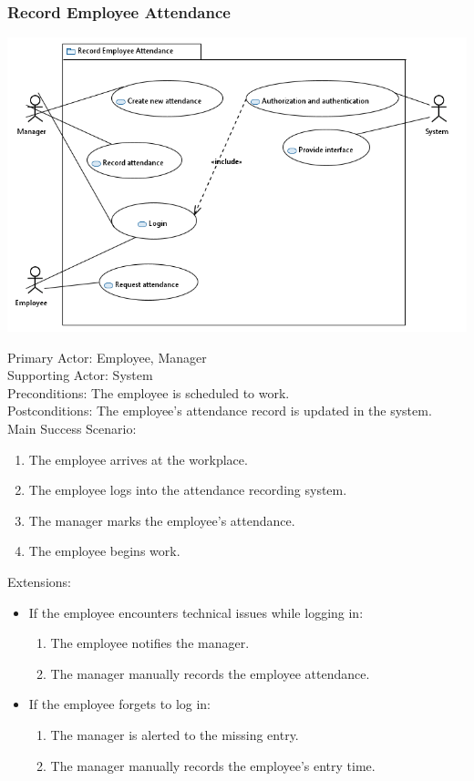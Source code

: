 \documentclass[a4paper, 12pt]{article}
\begin{document}
\subsubsection{Record Employee Attendance}
\begin{center}
\includegraphics[width=1\textwidth]{Record_Employee_Attendance_Use_Case.PNG}\par
\end{center}
Primary Actor: Employee, Manager\\
Supporting Actor: System\\
Preconditions: The employee is scheduled to work.\\
Postconditions: The employee's attendance record is updated in the system.\\
\newpage
Main Success Scenario:
\begin{enumerate}
    \item The employee arrives at the workplace.
    \item The employee logs into the attendance recording system.
    \item The manager marks the employee's attendance.
    \item The employee begins work.
\end{enumerate}
Extensions:
\begin{itemize}
    \item If the employee encounters technical issues while logging in:
    \begin{enumerate}
        \item The employee notifies the manager.
        \item The manager manually records the employee attendance.
    \end{enumerate}
    \item If the employee forgets to log in:
    \begin{enumerate}
        \item The manager is alerted to the missing entry.
        \item The manager manually records the employee's entry time.
    \end{enumerate}
\end{itemize}
\end{document}
